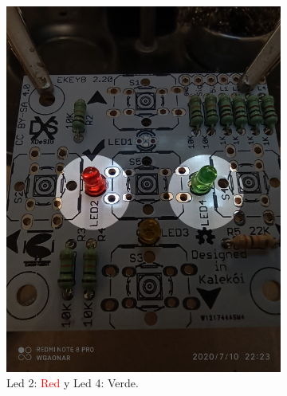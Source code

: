 \documentclass{article}
\begin{document}
\begin{figure}[H]
\begin{subfigure}[t]{0.3\textwidth}
        \includegraphics[width=0.9\columnwidth, height=1.2\columnwidth]{images/Botonera/led2.jpg}
        \caption{Led 2: \textcolor{red}{Red} y Led 4: \textcolor{OliveGreen}{Verde}.}
        \label{fig:botonera_led2}
    \end{subfigure}%
    \begin{subfigure}[t]{0.3\textwidth}
        \centering

\end{subfigure}
\end{figure}
\end{document}
